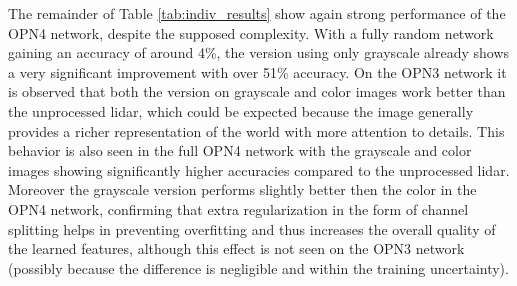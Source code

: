 The remainder of Table \ref{tab:indiv_results} show again strong performance of the OPN4 network, despite the supposed complexity. With a fully random network gaining an accuracy of around 4\%, the version using only grayscale already shows a very significant improvement with over 51\% accuracy. On the OPN3 network it is observed that both the version on grayscale and color images work better than the unprocessed lidar, which could be expected because the image generally provides a richer representation of the world with more attention to details. This behavior is also seen in the full OPN4 network with the grayscale and color images showing significantly higher accuracies compared to the unprocessed lidar. Moreover the grayscale version performs slightly better then the color in the OPN4 network, confirming that extra regularization in the form of channel splitting helps in preventing overfitting and thus increases the overall quality of the learned features, although this effect is not seen on the OPN3 network (possibly because the difference is negligible and within the training uncertainty).



